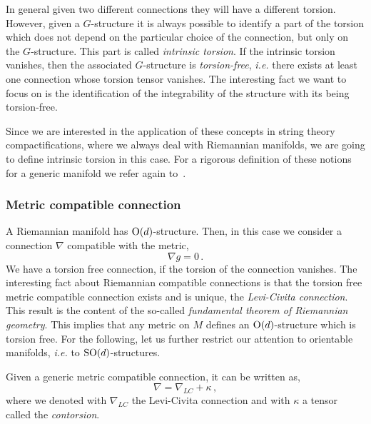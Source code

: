 \documentclass[debug]{phd}
\begin{document}
					In general given two different connections they will have a different torsion. 
					However, given a $G$-structure it is always possible to identify a part of the torsion which does not depend on the particular choice of the connection, but only on the $G$-structure.
					This part is called \emph{intrinsic torsion}.
					If the intrinsic torsion vanishes, then the associated $G$-structure is \emph{torsion-free}, \emph{i.e.} there exists at least one connection whose torsion tensor vanishes.
					The interesting fact we want to focus on is the identification of the integrability of the structure with its being torsion-free.
					
					Since we are interested in the application of these concepts in string theory compactifications, where we always deal with Riemannian manifolds, we are going to define intrinsic torsion in this case.
					For a rigorous definition of these notions for a generic manifold we refer again to~\cite{joyce}.
				\subsubsection{Metric compatible connection}
				 A Riemannian manifold has $\mathrm{O}(d)$-structure.
						Then, in this case we consider a connection $\nabla$ compatible with the metric, 
								\begin{equation}
									\nabla g = 0 \, .
								\end{equation}
						We have a torsion free connection, if the torsion of the connection vanishes.
						The interesting fact about Riemannian compatible connections is that the torsion free metric compatible connection exists and is unique, the \emph{Levi-Civita connection}.
						This result is the content of the so-called \emph{fundamental theorem of Riemannian geometry}.
						This implies that any metric on $M$ defines an $\mathrm{O}(d)$-structure which is torsion free.
						For the following, let us further restrict our attention to orientable manifolds, \emph{i.e.} to $\mathrm{SO}(d)$-structures.
						
						Given a generic metric compatible connection, it can be written as,
								\begin{equation}\label{contrs}
									\nabla = \nabla_{LC} + \kappa\, ,
								\end{equation}
						where we denoted with $\nabla_{LC}$ the Levi-Civita connection and with $\kappa$ a tensor called the \emph{contorsion}.
						
\end{document}
